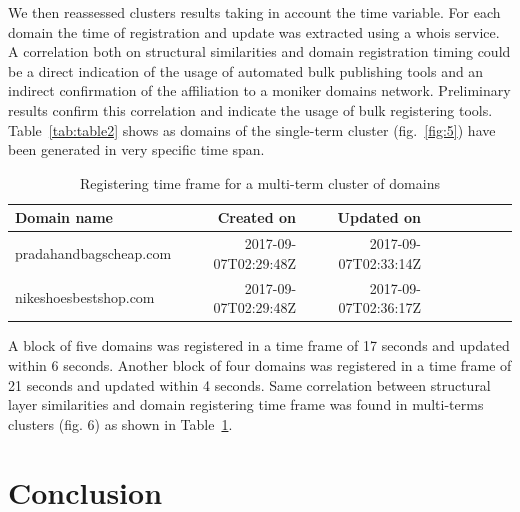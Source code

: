 \documentclass{easychair}
\begin{document}
We then reassessed clusters results taking in account the time variable. For each domain the time of registration and update was extracted using a whois service. A correlation both on structural similarities and domain registration timing could be a direct indication of the usage of automated bulk publishing tools and an indirect confirmation of the affiliation to a moniker domains network. Preliminary results confirm this correlation and indicate the usage of bulk registering tools. Table~\ref{tab:table2} shows as domains of the single-term cluster (fig.~\ref{fig:5}) have been generated in very specific time span.

\begin{table}[h]
  \begin{centering}
    \begin{tabular}{lrrrrrrrr}
    \hline
    Domain name           & Created on & Updated on \\
                          
    \hline
    pradahandbagscheap.com      &  2017-09-07T02:29:48Z & 2017-09-07T02:33:14Z  \\
   
    nikeshoesbestshop.com      &  2017-09-07T02:29:48Z & 2017-09-07T02:36:17Z  \\

    \hline
    \end{tabular}
    \caption{Registering time frame for a multi-term cluster of domains }
    \label{tab:table3}
  \end{centering}
\end{table} 
A block of five domains was registered in a time frame of 17 seconds and updated within 6 seconds. Another block of four domains was registered in a time frame of 21 seconds and updated within 4 seconds. Same correlation between structural layer similarities and domain registering time frame was found in multi-terms clusters (fig. 6) as shown in Table~\ref{tab:table3}. 

\section{Conclusion}
\label{sect:Conclusion}
\end{document}
